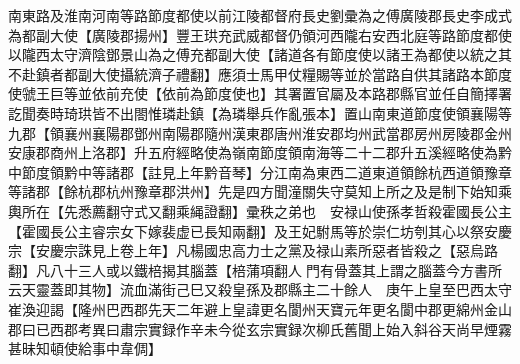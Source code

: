 南東路及淮南河南等路節度都使以前江陵都督府長史劉彚為之傅廣陵郡長史李成式為都副大使【廣陵郡揚州】豐王珙充武威都督仍領河西隴右安西北庭等路節度都使以隴西太守濟陰鄧景山為之傅充都副大使【諸道各有節度使以諸王為都使以統之其不赴鎮者都副大使攝統濟子禮翻】應須士馬甲仗糧賜等並於當路自供其諸路本節度使虢王巨等並依前充使【依前為節度使也】其署置官屬及本路郡縣官並任自簡擇署訖聞奏時琦珙皆不出閤惟璘赴鎮【為璘舉兵作亂張本】置山南東道節度使領襄陽等九郡【領襄州襄陽郡鄧州南陽郡隨州漢東郡唐州淮安郡均州武當郡房州房陵郡金州安康郡商州上洛郡】升五府經略使為嶺南節度領南海等二十二郡升五溪經略使為黔中節度領黔中等諸郡【註見上年黔音琴】分江南為東西二道東道領餘杭西道領豫章等諸郡【餘杭郡杭州豫章郡洪州】先是四方聞潼關失守莫知上所之及是制下始知乘輿所在【先悉薦翻守式又翻乘䋲證翻】彚秩之弟也　安禄山使孫孝哲殺霍國長公主【霍國長公主睿宗女下嫁裴虚已長知兩翻】及王妃駙馬等於崇仁坊刳其心以祭安慶宗【安慶宗誅見上卷上年】凡楊國忠高力士之黨及禄山素所惡者皆殺之【惡烏路翻】凡八十三人或以鐵棓揭其腦蓋【棓蒲項翻人門有骨蓋其上謂之腦蓋今方書所云天靈蓋即其物】流血滿街己巳又殺皇孫及郡縣主二十餘人　庚午上皇至巴西太守崔渙迎謁【隆州巴西郡先天二年避上皇諱更名閬州天寶元年更名閬中郡更綿州金山郡曰已西郡考異曰肅宗實録作辛未今從玄宗實録次柳氏舊聞上始入斜谷天尚早煙霧甚昧知頓使給事中韋倜】

